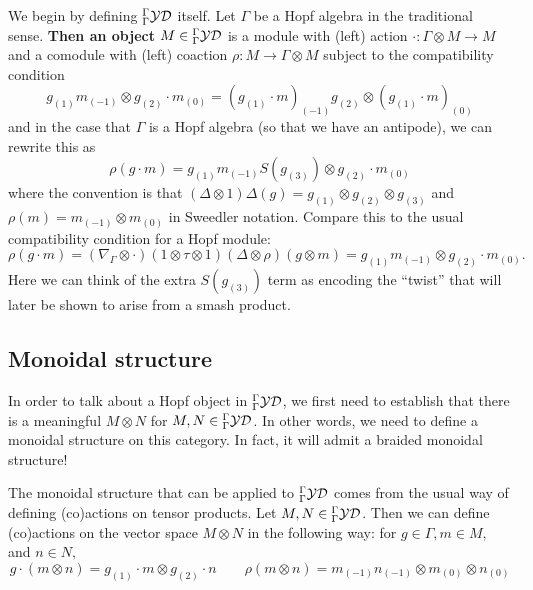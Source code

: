 \documentclass [11pt, proquest] {uwthesis}[2020/02/24]
\begin{document}
    We begin by defining ${^\Gamma_\Gamma\mathcal{YD}}$ itself. Let $\Gamma$ be a Hopf algebra in the traditional sense. \textbf{Then an object $M\in {^\Gamma_\Gamma\mathcal{YD}}$} is a module with (left) action $\cdot:\Gamma\otimes M\to M$ and a comodule with (left) coaction $\rho:M\to \Gamma\otimes M$ subject to the compatibility condition
    \begin{equation}\label{eq:yd-condition}
        g_{(1)}m_{(-1)}\otimes g_{(2)}\cdot m_{(0)}=(g_{(1)}\cdot m)_{(-1)}g_{(2)}\otimes (g_{(1)}\cdot m)_{(0)}
    \end{equation}
    and in the case that $\Gamma$ is a Hopf algebra (so that we have an antipode), we can rewrite this as
    \begin{equation}\label{eq:hopf-yd-condition}
        \rho(g\cdot m)=g_{(1)}m_{(-1)}S(g_{(3)})\otimes g_{(2)}\cdot m_{(0)}
    \end{equation}
    where the convention is that $(\Delta\otimes 1)\Delta(g)=g_{(1)}\otimes g_{(2)}\otimes g_{(3)}$ and $\rho(m)=m_{(-1)}\otimes m_{(0)}$ in Sweedler notation. Compare this to the usual compatibility condition for a Hopf module:
    \[\rho(g\cdot m)=(\nabla_\Gamma\otimes \cdot)(1\otimes\tau\otimes 1)(\Delta\otimes\rho)(g\otimes m)=g_{(1)}m_{(-1)}\otimes g_{(2)}\cdot m_{(0)}.\]
    Here we can think of the extra $S(g_{(3)})$ term as encoding the ``twist'' that will later be shown to arise from a smash product.

\subsection{Monoidal structure}
    In order to talk about a Hopf object in ${^\Gamma_\Gamma\mathcal{YD}}$, we first need to establish that there is a meaningful $M\otimes N$ for $M,N\in{^\Gamma_\Gamma\mathcal{YD}}$. In other words, we need to define a monoidal structure on this category. In fact, it will admit a braided monoidal structure!
    
    The monoidal structure that can be applied to ${^\Gamma_\Gamma\mathcal{YD}}$ comes from the usual way of defining (co)actions on tensor products. Let $M,N\in{^\Gamma_\Gamma\mathcal{YD}}$. Then we can define (co)actions on the vector space $M\otimes N$ in the following way: for $g\in \Gamma, m\in M,$ and $n\in N,$
    \begin{equation}\label{eq:tensor-action-coaction}
        g\cdot (m\otimes n)=g_{(1)}\cdot m\otimes g_{(2)}\cdot n\qquad \rho(m\otimes n)=m_{(-1)}n_{(-1)}\otimes m_{(0)}\otimes n_{(0)}
    \end{equation}
    
\end{document}
